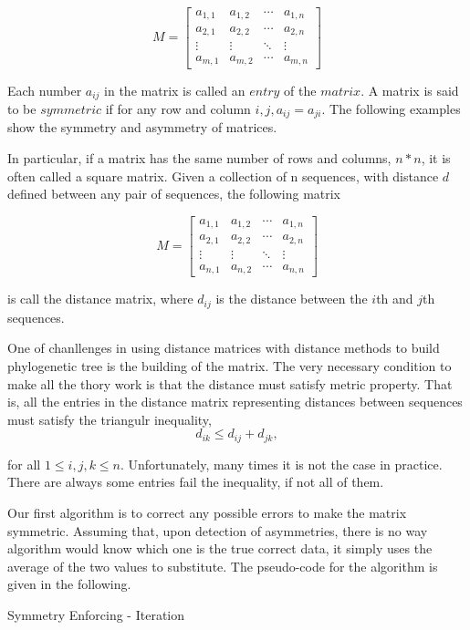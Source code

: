 \[
M = \begin{bmatrix}
	a_{1,1} & a_{1,2} & \cdots & a_{1,n} \\
  	a_{2,1} & a_{2,2} & \cdots & a_{2,n} \\
  	\vdots  & \vdots  & \ddots & \vdots  \\
  	a_{m,1} & a_{m,2} & \cdots & a_{m,n}
\end{bmatrix}
\]

Each number $a_{ij}$ in the matrix is called an $entry$ of the $matrix$. 
A matrix is said to be $symmetric$ if for any row and column 
$i,j, a_{ij} = a_{ji}$. The following examples show the 
symmetry and asymmetry of matrices.

In particular, if a matrix has the same number of rows 
and columns, $n*n$, it is often called a square matrix. 
Given a collection of n sequences, with distance $d$ defined 
between any pair of sequences, the following matrix

\[
M = \begin{bmatrix}
	a_{1,1} & a_{1,2} & \cdots & a_{1,n} \\
  	a_{2,1} & a_{2,2} & \cdots & a_{2,n} \\
  	\vdots  & \vdots  & \ddots & \vdots  \\
  	a_{n,1} & a_{n,2} & \cdots & a_{n,n}
\end{bmatrix}
\]

is call the distance matrix, where $d_{ij}$ is the distance 
between the $i$th and $j$th sequences.

One of chanllenges in using distance matrices with distance 
methods to build phylogenetic tree is the building of the matrix. 
The very necessary condition to make all the thory work is that 
the distance must satisfy metric property. That is, all the 
entries in the distance matrix representing distances between 
sequences must satisfy the triangulr inequality,
\[
d_{ik} \leq d_{ij} + d_{jk},
\]

for all $1 \leq i,j,k \leq n$. Unfortunately, many times 
it is not the case in practice. There are always some 
entries fail the inequality, if not all of them.

Our first algorithm is to correct any possible errors to 
make the matrix symmetric. Assuming that, upon detection 
of asymmetries, there is no way algorithm would know which 
one is the true correct data, it simply uses the average 
of the two values to substitute. The pseudo-code for the 
algorithm is given in the following. 


\begin{algorithm}[H]
\SetAlgoRefName{}	
\caption{Symmetry Enforcing - Iteration}
\end{algorithm}

